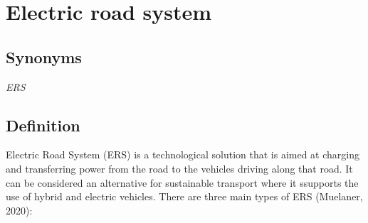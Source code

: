 \documentclass[
]{book}
\begin{document}
\hypertarget{ers}{%
\section{Electric road system}\label{ers}}

\hypertarget{synonyms-2}{%
\subsection*{Synonyms}\label{synonyms-2}}

\emph{ERS}

\hypertarget{definition-2}{%
\subsection*{Definition}\label{definition-2}}

Electric Road System (ERS) is a technological solution that is aimed at charging and transferring power from the road to the vehicles driving along that road. It can be considered an alternative for sustainable transport where it ssupports the use of hybrid and electric vehicles. There are three main types of ERS (Muelaner, 2020):
\end{document}
